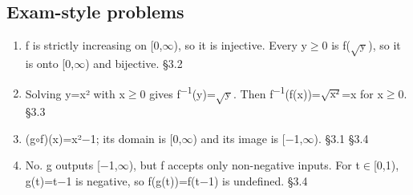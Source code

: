 \documentclass[11pt]{article}
\begin{document}
\begin{keepsection}\subsection{Exam-style problems}

\begin{enumerate}
\item f is strictly increasing on [0,\ensuremath{\infty}), so it is injective. Every y\ensuremath{\geq}0 is f(\ensuremath{\sqrt{\mathrm{y}}}), so it is onto [0,\ensuremath{\infty}) and bijective. \hfill{\small\color{FAUblue}§3.2}
\item Solving y=x² with x\ensuremath{\geq}0 gives f\textsuperscript{\ensuremath{-}1}(y)=\ensuremath{\sqrt{\mathrm{y}}}. Then f\textsuperscript{\ensuremath{-}1}(f(x))=\ensuremath{\sqrt{\mathrm{x}²}}=x for x\ensuremath{\geq}0. \hfill{\small\color{FAUblue}§3.3}
\item (g\ensuremath{\circ}f)(x)=x²\ensuremath{-}1; its domain is [0,\ensuremath{\infty}) and its image is [\ensuremath{-}1,\ensuremath{\infty}). \hfill{\small\color{FAUblue}§3.1} \hfill{\small\color{FAUblue}§3.4}
\item No. g outputs [\ensuremath{-}1,\ensuremath{\infty}), but f accepts only non-negative inputs. For t\ensuremath{\in}[0,1), g(t)=t\ensuremath{-}1 is negative, so f(g(t))=f(t\ensuremath{-}1) is undefined. \hfill{\small\color{FAUblue}§3.4}
\end{enumerate}

\end{keepsection}
\end{document}
